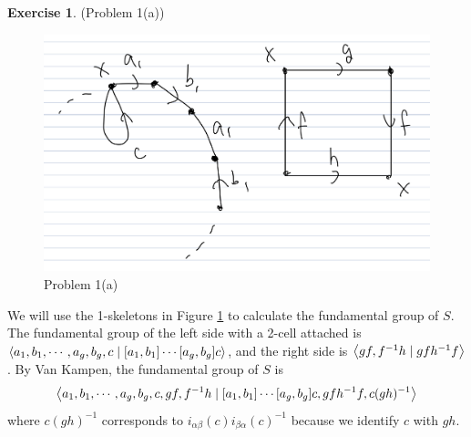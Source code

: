 \documentclass[12pt, psamsfonts]{amsart}
\theoremstyle{definition}
\newtheorem*{exer}{Exercise}
\theoremstyle{remark}
\numberwithin{equation}{section}
\begin{document}
\begin{exer}{(Problem 1(a))}
  \begin{figure}[!htb]
    \includegraphics[width=.7\linewidth]{problem1_a.jpeg}
    \caption{Problem 1(a)}
    \label{fig:problem1a}
  \end{figure}
  We will use the 1-skeletons in Figure \ref{fig:problem1a} to calculate the fundamental group of $S$.
  The fundamental group of the left side with a 2-cell attached is $\ev{a_1, b_1, \cdots, a_g, b_g, c \mid [a_1, b_1] \cdots [a_g, b_g]c}$, and the right side is $\ev{gf, f^{-1}h \mid gfh^{-1}f}$.
  By Van Kampen, the fundamental group of $S$ is 
  \begin{align*}
    \ev{ a_1, b_1, \cdots, a_g, b_g, c, gf, f^{-1}h \mid [a_1, b_1] \cdots [a_g, b_g]c, gfh^{-1}f, c(gh)^{-1}}
  \end{align*}
  where $c(gh)^{-1}$ corresponds to $i_{\alpha\beta}(c)i_{\beta\alpha}(c)^{-1}$ because we identify $c$ with $gh$.
\end{exer}
\end{document}
